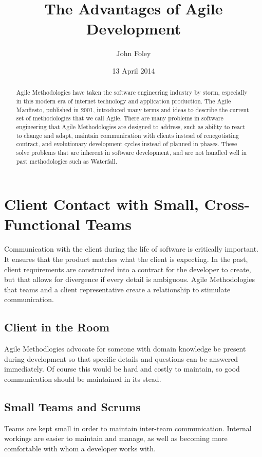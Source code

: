 \documentclass[11pt]{article}
\title{The Advantages of Agile Development}
\author{John Foley}
\date{13 April 2014}
\begin{document}
\maketitle

\thispagestyle{empty}

\begin{abstract}
  Agile Methodologies have taken the software engineering industry by storm, especially in this modern
  era of internet technology and application production. The Agile Manfiesto, published in 2001,
 introduced many terms and ideas to describe the current set of methodologies that we call Agile. There are many
 problems in software engineering that Agile Methodologies are designed to address, such as ability to react to 
 change and adapt, maintain communication with clients instead of renegotiating contract, and evolutionary development cycles
 instead of planned in phases. These solve problems that are inherent in software development, and are not handled well in past
 methodologies such as Waterfall. 
\end{abstract}

\section{Client Contact with Small, Cross-Functional Teams}

Communication with the client during the life of software is critically important. It ensures that the product matches
what the client is expecting. In the past, client requirements are constructed into a contract for the developer to create,
but that allows for divergence if every detail is ambiguous.  Agile Methodologies that teams and a client representative
create a relationship to stimulate communication.

\subsection{Client in the Room}
Agile Methodlogies advocate for someone with domain knowledge be present during development so that specific details and 
questions can be answered immediately. Of course this would be hard and costly to maintain, so good communication 
should be maintained in its stead.

\subsection{Small Teams and Scrums}
Teams are kept small in order to maintain inter-team communication. Internal workings are easier to maintain and manage,
as well as becoming more comfortable with whom a developer works with.
\end{document}
